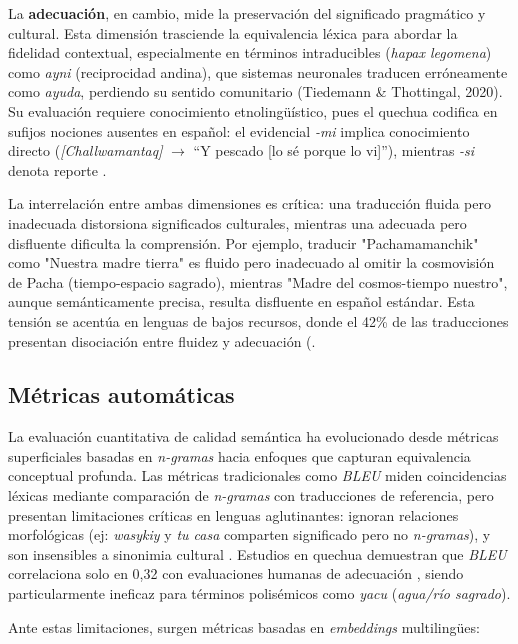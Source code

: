         La \textbf{adecuación}, en cambio, mide la preservación del significado pragmático y cultural. Esta dimensión trasciende la equivalencia léxica para abordar la fidelidad contextual, especialmente en términos intraducibles (\textit{hapax legomena}) como \textit{ayni} (reciprocidad andina), que sistemas neuronales traducen erróneamente como \textit{ayuda}, perdiendo su sentido comunitario (Tiedemann \& Thottingal, 2020). Su evaluación requiere conocimiento etnolingüístico, pues el quechua codifica en sufijos nociones ausentes en español: el evidencial \textit{-mi} implica conocimiento directo (\textit{[Challwamantaq]} $\rightarrow$ ``Y pescado [lo sé porque lo vi]''), mientras \textit{-si} denota reporte \cite{rei2022comet}.
        
        
        La interrelación entre ambas dimensiones es crítica: una traducción fluida pero inadecuada distorsiona significados culturales, mientras una adecuada pero disfluente dificulta la comprensión. Por ejemplo, traducir "Pachamamanchik" como "Nuestra madre tierra" es fluido pero inadecuado al omitir la cosmovisión de Pacha (tiempo-espacio sagrado), mientras "Madre del cosmos-tiempo nuestro", aunque semánticamente precisa, resulta disfluente en español estándar. Esta tensión se acentúa en lenguas de bajos recursos, donde el 42\% de las traducciones presentan disociación entre fluidez y adecuación (\cite{neubig2018rapid}.
        
        \subsection{Métricas automáticas}
        La evaluación cuantitativa de calidad semántica ha evolucionado desde métricas superficiales basadas en \textit{n-gramas} hacia enfoques que capturan equivalencia conceptual profunda. Las métricas tradicionales como \textit{BLEU} \cite{papineni2002bleu} miden coincidencias léxicas mediante comparación de \textit{n-gramas} con traducciones de referencia, pero presentan limitaciones críticas en lenguas aglutinantes: ignoran relaciones morfológicas (ej: \textit{wasykiy} y \textit{tu casa} comparten significado pero no \textit{n-gramas}), y son insensibles a sinonimia cultural \cite{tiedemann2020opus}. Estudios en quechua demuestran que \textit{BLEU} correlaciona solo en 0{,}32 con evaluaciones humanas de adecuación \cite{rios2015basic}, siendo particularmente ineficaz para términos polisémicos como \textit{yacu} (\textit{agua/río sagrado}).

        Ante estas limitaciones, surgen métricas basadas en \textit{embeddings} multilingües:
        
